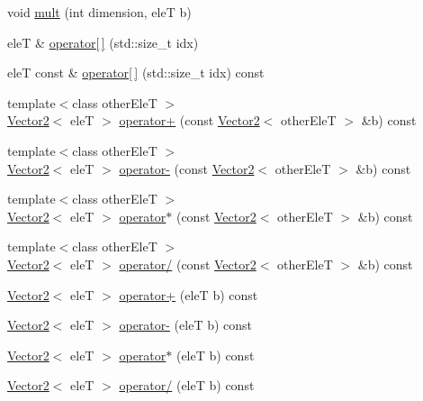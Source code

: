 \begin{DoxyCompactItemize}
\item 
void \hyperlink{classfc_1_1Vector2_a14fc0e3dd940443f5cd065d2d25b5c3c}{mult} (int dimension, eleT b)
\item 
eleT \& \hyperlink{classfc_1_1Vector2_abb9db025bf3896fa1d14faa5d905cb43}{operator\mbox{[}$\,$\mbox{]}} (std\+::size\+\_\+t idx)
\item 
eleT const  \& \hyperlink{classfc_1_1Vector2_a22b3832145d462caeb294767416253ef}{operator\mbox{[}$\,$\mbox{]}} (std\+::size\+\_\+t idx) const
\item 
{\footnotesize template$<$class other\+EleT $>$ }\\\hyperlink{classfc_1_1Vector2}{Vector2}$<$ eleT $>$ \hyperlink{classfc_1_1Vector2_a9d656278089d6b2da7bdae8a1112551d}{operator+} (const \hyperlink{classfc_1_1Vector2}{Vector2}$<$ other\+EleT $>$ \&b) const
\item 
{\footnotesize template$<$class other\+EleT $>$ }\\\hyperlink{classfc_1_1Vector2}{Vector2}$<$ eleT $>$ \hyperlink{classfc_1_1Vector2_a7e15b16fc37078fdf982b7ba9753d6d8}{operator-\/} (const \hyperlink{classfc_1_1Vector2}{Vector2}$<$ other\+EleT $>$ \&b) const
\item 
{\footnotesize template$<$class other\+EleT $>$ }\\\hyperlink{classfc_1_1Vector2}{Vector2}$<$ eleT $>$ \hyperlink{classfc_1_1Vector2_a5b839a912dfd536facec32a7dd6e098b}{operator$\ast$} (const \hyperlink{classfc_1_1Vector2}{Vector2}$<$ other\+EleT $>$ \&b) const
\item 
{\footnotesize template$<$class other\+EleT $>$ }\\\hyperlink{classfc_1_1Vector2}{Vector2}$<$ eleT $>$ \hyperlink{classfc_1_1Vector2_aa955f41047305cd02519b12a51b2dd59}{operator/} (const \hyperlink{classfc_1_1Vector2}{Vector2}$<$ other\+EleT $>$ \&b) const
\item 
\hyperlink{classfc_1_1Vector2}{Vector2}$<$ eleT $>$ \hyperlink{classfc_1_1Vector2_a76adc9084c6cc865b7373e1958aba086}{operator+} (eleT b) const
\item 
\hyperlink{classfc_1_1Vector2}{Vector2}$<$ eleT $>$ \hyperlink{classfc_1_1Vector2_ab5f7abbdd873f2a1bd149b7df7ad04b1}{operator-\/} (eleT b) const
\item 
\hyperlink{classfc_1_1Vector2}{Vector2}$<$ eleT $>$ \hyperlink{classfc_1_1Vector2_a95ca7ccecaf2c836675aa8a6f8972061}{operator$\ast$} (eleT b) const
\item 
\hyperlink{classfc_1_1Vector2}{Vector2}$<$ eleT $>$ \hyperlink{classfc_1_1Vector2_a1f4f03cbeb10fd83693db84a92ae7276}{operator/} (eleT b) const

\end{DoxyCompactItemize}

